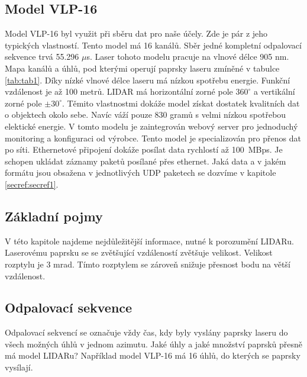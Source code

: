 \documentclass[czech,bachelor,dept420,male,cpdeclaration]{diploma}
\begin{document}
\subsection{Model VLP-16}
Model VLP-16 byl využit při sběru dat pro naše účely. Zde je pár z jeho typických vlastností. Tento model má 16 kanálů. Sběr jedné kompletní odpalovací sekvence trvá \num{55,296} $\mu$s. Laser tohoto modelu pracuje na vlnové délce \num{905} \si{\nano\metre}. Mapa kanálů a úhlů, pod kterými operují paprsky laseru zmíněné v tabulce \ref{tab:tab1}. Díky nízké vlnové délce laseru má nízkou spotřebu energie. Funkční vzdálenost je až \num{100} metrů. LIDAR má horizontální zorné pole $360^ \circ$ a vertikální zorné pole $\pm 30^\circ$. Těmito vlastnostmi dokáže  model získat dostatek kvalitních dat o objektech okolo sebe. Navíc váží pouze \num{830} gramů s velmi nízkou spotřebou elektické energie. V tomto modelu je zaintegrován webový server pro jednoduchý monitoring a konfiguraci od výrobce. Tento model je specializován pro přenos dat po síti. Ethernetové připojení dokáže posílat data rychlostí až \SI{100}{MBps}. Je schopen ukládat záznamy paketů posílané přes ethernet. Jaká data a v jakém formátu jsou obsažena v jednotlivých UDP paketech se dozvíme v kapitole \ref{secref:secref1}.



\subsection{Základní pojmy}\label{sec:sec1}
V této kapitole najdeme nejdůležitější informace, nutné k porozumění LIDARu. Laserovému paprsku se se zvětšující vzdáleností zvětšuje velikost. Velikost rozptylu je \num{3} \si{\milli\radian}. Tímto rozptylem se zároveň snižuje přesnost bodu na větší vzdálenost.

\subsection{Odpalovací sekvence}
Odpalovací sekvencí se označuje vždy čas, kdy byly vyslány paprsky laseru do všech možných úhlů v jednom azimutu. 
Jaké úhly a jaké množství paprsků přesně má model LIDARu? Například model VLP-16 má 16 úhlů, do kterých se paprsky vysílají. 
\end{document}
